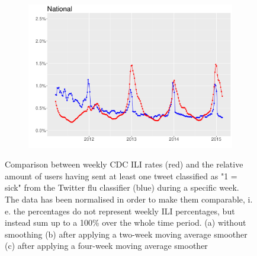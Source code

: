 \documentclass[11pt, a4paper]{report}\usepackage[]{graphicx}\usepackage[]{color}
\begin{document}
\begin{figure}[h]
  \begin{subfigure}[t]{0.6\textwidth}
  \includegraphics[width=1\linewidth,height=0.5\linewidth]{cdc_twitter_comp_nat_ma4_user.pdf}
  \caption{}
  \label{cdc_tw_comp_nat_ma4_user}
  \end{subfigure}
  \caption{Comparison between weekly CDC ILI rates (red) and the relative amount of users having sent at least one tweet classified as "1 = sick" from the Twitter flu classifier (blue) during a specific week. The data has been normalised in order to make them comparable, i. e. the percentages do not represent weekly ILI percentages, but instead sum up to a 100\% over the whole time period. (a) without smoothing (b) after applying a two-week moving average smoother (c) after applying a four-week moving average smoother}
\end{figure}
\end{document}
